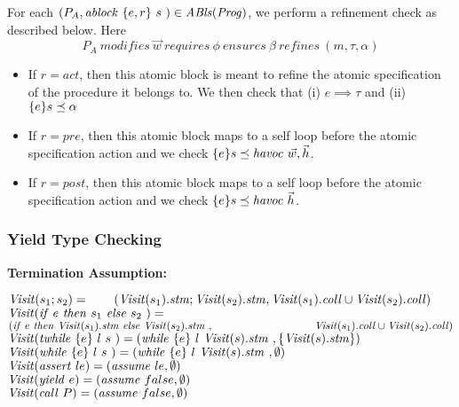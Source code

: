 For each $(P_{A}, \mathit{ablock}\ {\{e,r\}}\ {s}\ ) \in \mathit{ABls}(\mathit{Prog})$, we perform a refinement check as described below. Here 
$$P_{A}\ \mathit{modifies}\
\vec{w}\ \mathit{requires}\ \phi\ \mathit{ensures}\ \beta\
\mathit{refines}\ (m, \tau, \alpha)$$
\begin{itemize}
\item If $r = \mathit{act}$, then this atomic block is meant to refine the atomic specification of the procedure it belongs to. We then check that 
(i) $e \implies \tau$ and 
(ii) $\{ {e} \} {s} \preceq {\alpha}$
\item If $r = \mathit{pre}$, then this atomic block maps to a self loop before the atomic specification action and we check $\{ {e} \} {s} \preceq {\mathit{havoc }\ \vec{w}, \vec{h}}$. 
\item If $r = \mathit{post}$, then this atomic block maps to a self loop before the atomic specification action and we check $\impl{e}{s}{\mathit{havoc }\ \hiddenVars}$. 
\end{itemize}

\subsubsection{Yield Type Checking}

{\bf Termination Assumption:}

\noindent
${\mathit{Visit}}(s_1; s_2) = \\ \hspace*{0.7cm} ({\mathit{Visit}}(s_1).\mathit{stm}; {\mathit{Visit}}(s_2).\mathit{stm}, {\mathit{Visit}}(s_1).\mathit{coll} \cup {\mathit{Visit}}(s_2).\mathit{coll})$\\
${\mathit{Visit}}({\mathit{if}\ {e}\ }{\mathit{then}\ {s_1}\ }{\mathit{else}\ { s_2}\ }) = $  \\
\hspace*{1.3cm}$( \ite{e}{\Visit(s_1).\stm}{\Visit(s_2).\stm}, \\
\hspace*{3.3cm}\Visit(s_1).\coll \cup \Visit(s_2).\coll)$\\
${\mathit{Visit}}(\mathit{twhile}\ \{{e}\}\ {{l}\ } {{s}\ }) = ( \mathit{while}\ \{{e}\}\ {{l}\ } {{{\mathit{Visit}}(s).\mathit{stm}}\ }, \{{\mathit{Visit}}(s).\mathit{stm}\} )$\\
${\mathit{Visit}}(\mathit{while}\ \{{e}\}\ {{l}\ } {{s}\ }) = ( \mathit{while}\ \{{e}\}\ {{l}\ } {{{\mathit{Visit}}(s).\mathit{stm}}\ }, \emptyset)$\\
${\mathit{Visit}}(\mathit{assert}\ le) = (\mathit{assume}\ le, \emptyset)$\\
${\mathit{Visit}}(\mathit{yield}\ e) = (\mathit{assume}\ false, \emptyset)$\\
${\mathit{Visit}}(\mathit{call}\ P) = (\mathit{assume}\ false, \emptyset)$\\


